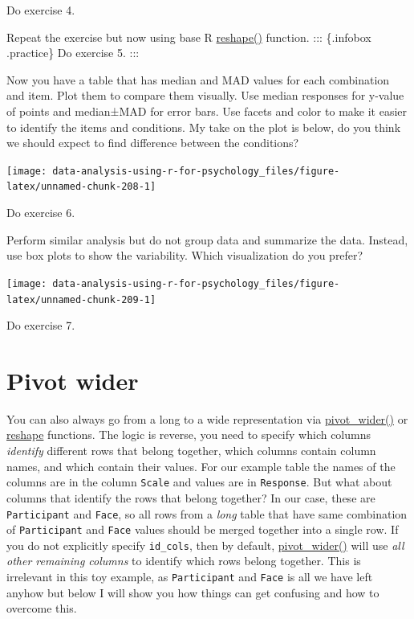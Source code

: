 \documentclass[
]{book}
\begin{document}
Do exercise 4.

Repeat the exercise but now using base R \href{https://stat.ethz.ch/R-manual/R-patched/library/stats/html/reshape.html}{reshape()} function.
::: \{.infobox .practice\}
Do exercise 5.
:::

Now you have a table that has median and MAD values for each combination and item. Plot them to compare them visually. Use median responses for y-value of points and median±MAD for error bars. Use facets and color to make it easier to identify the items and conditions. My take on the plot is below, do you think we should expect to find difference between the conditions?

\begin{center}\texttt{[image: data-analysis-using-r-for-psychology\_files/figure-latex/unnamed-chunk-208-1]} \end{center}

Do exercise 6.

Perform similar analysis but do not group data and summarize the data. Instead, use box plots to show the variability. Which visualization do you prefer?

\begin{center}\texttt{[image: data-analysis-using-r-for-psychology\_files/figure-latex/unnamed-chunk-209-1]} \end{center}

Do exercise 7.

\hypertarget{pivot-wider}{%
\section{Pivot wider}\label{pivot-wider}}

You can also always go from a long to a wide representation via \href{https://tidyr.tidyverse.org/reference/pivot_wider.html}{pivot\_wider()} or \href{https://stat.ethz.ch/R-manual/R-patched/library/stats/html/reshape.html}{reshape} functions. The logic is reverse, you need to specify which columns \emph{identify} different rows that belong together, which columns contain column names, and which contain their values. For our example table the names of the columns are in the column \texttt{Scale} and values are in \texttt{Response}. But what about columns that identify the rows that belong together? In our case, these are \texttt{Participant} and \texttt{Face}, so all rows from a \emph{long} table that have same combination of \texttt{Participant} and \texttt{Face} values should be merged together into a single row. If you do not explicitly specify \texttt{id\_cols}, then by default, \href{https://tidyr.tidyverse.org/reference/pivot_wider.html}{pivot\_wider()} will use \emph{all other remaining columns} to identify which rows belong together. This is irrelevant in this toy example, as \texttt{Participant} and \texttt{Face} is all we have left anyhow but below I will show you how things can get confusing and how to overcome this.
\end{document}
